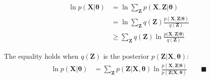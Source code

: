 \documentclass[smallextended]{svjour3}          %
\begin{document}
\begin{align}
\ln p(\mathbf{X} | \boldsymbol{\theta}) &=  \ln \sum_{\mathbf{Z}}  p(\mathbf{X}, \mathbf{Z}  | \boldsymbol{\theta}) \\
&=\ln \sum_{\mathbf{Z}} q(\mathbf{Z}) \frac{p(\mathbf{X}, \mathbf{Z}  | \boldsymbol{\theta})}{ q(\mathbf{Z})}\\
&\geq \sum_{\mathbf{Z}} q(\mathbf{Z}) \ln \frac{p(\mathbf{X}, \mathbf{Z} | \boldsymbol{\theta)}}{q(\mathbf{Z})}
\end{align}


The equality holds when $q(\mathbf{Z})$ is the posterior $p(\mathbf{Z} | \mathbf{X}, \boldsymbol{\theta})$:
\begin{align}
\ln p(\mathbf{X} | \boldsymbol{\theta}) &=  \sum_{\mathbf{Z}} p(\mathbf{Z} | \mathbf{X}, \boldsymbol{\theta}) \ln \frac{p(\mathbf{X, Z} | \boldsymbol{\theta})}{ p(\mathbf{Z} | \mathbf{X}, \boldsymbol{\theta})} \qquad \blacksquare
\label{eq:em_general}
\end{align}
 

\end{document}
